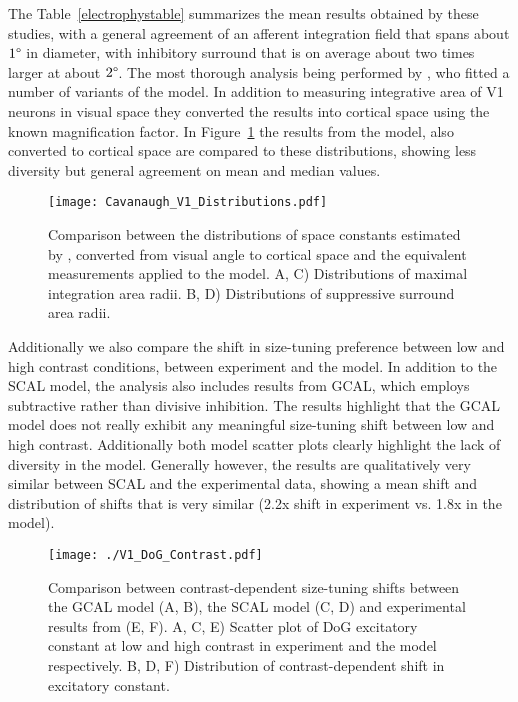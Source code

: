 The Table~\ref{electrophystable} summarizes the mean results obtained
by these studies, with a general agreement of an afferent integration
field that spans about $1\degree$ in diameter, with inhibitory
surround that is on average about two times larger at about
$2\degree$. The most thorough analysis being performed by
\cite{Cavanaugh2002}, who fitted a number of variants of the model. In
addition to measuring integrative area of V1 neurons in visual space
they converted the results into cortical space using the known
magnification factor. In Figure~\ref{CavanaughDistribution} the
results from the model, also converted to cortical space are compared
to these distributions, showing less diversity but general agreement
on mean and median values.

\begin{figure}
	\centering
        \texttt{[image: Cavanaugh\_V1\_Distributions.pdf]}
	\caption[Distribution of V1 Difference-of-Gaussian space constants
      measured by \cite{Cavanaugh2002} compared to SCAL
      model.]{Comparison between the distributions of space constants
      estimated by \cite{Cavanaugh2002}, converted from visual angle
      to cortical space and the equivalent measurements applied to the
      model. A, C) Distributions of maximal integration area radii.
      B, D) Distributions of suppressive surround area radii. }
	\label{CavanaughDistribution}
\end{figure}

Additionally we also compare the shift in size-tuning preference
between low and high contrast conditions, between experiment
\citep{Sceniak1999} and the model. In addition to the SCAL model, the
analysis also includes results from GCAL, which employs subtractive
rather than divisive inhibition. The results highlight that the GCAL
model does not really exhibit any meaningful size-tuning shift between
low and high contrast. Additionally both model scatter plots clearly
highlight the lack of diversity in the model. Generally however, the
results are qualitatively very similar between SCAL and the
experimental data, showing a mean shift and distribution of shifts
that is very similar (2.2x shift in experiment vs. 1.8x in the model).

\begin{figure}
	\centering
        \texttt{[image: ./V1\_DoG\_Contrast.pdf]}
	\caption[Contrast-dependent size-tuning shifts compared between
      GCAL, SCAL and experimental results from
      \cite{Sceniak1999}.]{Comparison between contrast-dependent 
      size-tuning shifts between the GCAL model (A, B), the SCAL model (C,
      D) and experimental results from \cite{Sceniak1999} (E, F). A,
      C, E) Scatter plot of DoG excitatory constant at low and high
      contrast in experiment and the model respectively. B, D, F)
      Distribution of contrast-dependent shift in excitatory
      constant.}
	\label{ContrastShift}
\end{figure}

